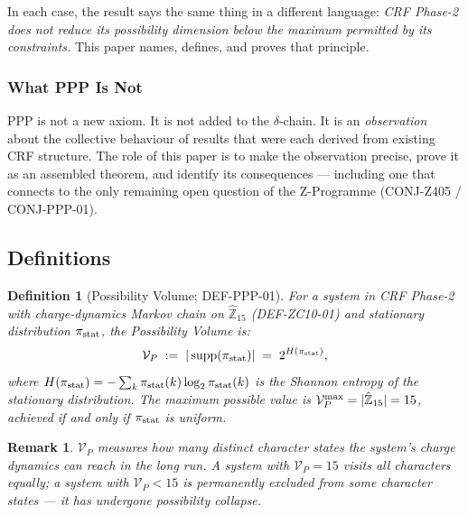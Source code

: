 \documentclass[12pt, a4paper]{article}
\newtheorem{definition}{Definition}[section]
\newtheorem{remark}{Remark}[section]
\begin{document}
In each case, the result says the same thing in a different language:
\emph{CRF Phase-2 does not reduce its possibility dimension below the
maximum permitted by its constraints.} This paper names, defines, and
proves that principle.

\subsubsection{What PPP Is Not}

PPP is not a new axiom. It is not added to the $\delta$-chain.
It is an \emph{observation} about the collective behaviour of
results that were each derived from existing CRF structure.
The role of this paper is to make the observation precise, prove
it as an assembled theorem, and identify its consequences ---
including one that connects to the only remaining open question
of the Z-Programme (CONJ-Z405 / CONJ-PPP-01).

\subsection{Definitions}
\label{sec:defs}

\begin{definition}[Possibility Volume; DEF-PPP-01]
\label{def:V_P}
For a system in CRF Phase-2 with charge-dynamics Markov chain
on $\hat{\mathbb{Z}}_{15}$ (DEF-ZC10-01) and stationary
distribution $\pi_{\rm stat}$, the \emph{Possibility Volume} is:
\begin{equation}
  \mathcal{V}_P \;:=\;
  |\operatorname{supp}(\pi_{\rm stat})|
  \;=\; 2^{H(\pi_{\rm stat})},
  \label{eq:VP-def}
\end{equation}
where $H(\pi_{\rm stat}) = -\sum_k \pi_{\rm stat}(k) \log_2
\pi_{\rm stat}(k)$ is the Shannon entropy of the stationary
distribution. The maximum possible value is
$\mathcal{V}_P^{\rm max} = |\hat{\mathbb{Z}}_{15}| = 15$,
achieved if and only if $\pi_{\rm stat}$ is uniform.
\end{definition}

\begin{remark}
$\mathcal{V}_P$ measures how many distinct character states
the system's charge dynamics can reach in the long run. A system
with $\mathcal{V}_P = 15$ visits all characters equally; a system
with $\mathcal{V}_P < 15$ is permanently excluded from some
character states --- it has undergone \emph{possibility collapse}.
\end{remark}
\end{document}
